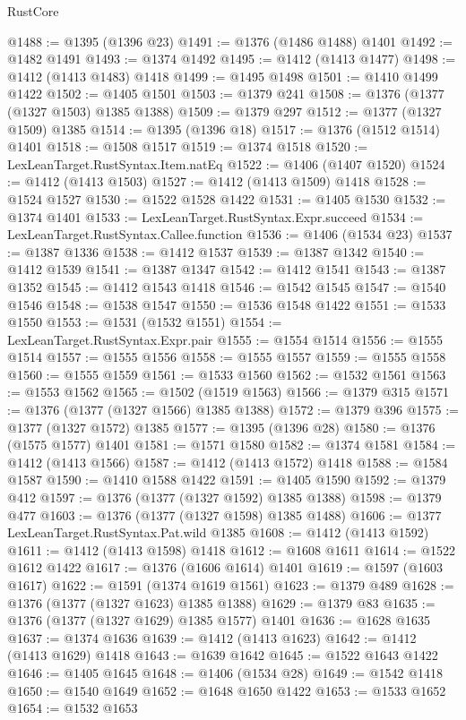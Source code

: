 \begin{lexlean}{RustCore}
\begin{coremodule}
@1488 := @1395 (@1396 @23)
@1491 := @1376 (@1486 @1488) @1401
@1492 := @1482 @1491
@1493 := @1374 @1492
@1495 := @1412 (@1413 @1477)
@1498 := @1412 (@1413 @1483) @1418
@1499 := @1495 @1498
@1501 := @1410 @1499 @1422
@1502 := @1405 @1501
@1503 := @1379 @241
@1508 := @1376 (@1377 (@1327 @1503) @1385 @1388)
@1509 := @1379 @297
@1512 := @1377 (@1327 @1509) @1385
@1514 := @1395 (@1396 @18)
@1517 := @1376 (@1512 @1514) @1401
@1518 := @1508 @1517
@1519 := @1374 @1518
@1520 := LexLeanTarget.RustSyntax.Item.natEq
@1522 := @1406 (@1407 @1520)
@1524 := @1412 (@1413 @1503)
@1527 := @1412 (@1413 @1509) @1418
@1528 := @1524 @1527
@1530 := @1522 @1528 @1422
@1531 := @1405 @1530
@1532 := @1374 @1401
@1533 := LexLeanTarget.RustSyntax.Expr.succeed
@1534 := LexLeanTarget.RustSyntax.Callee.function
@1536 := @1406 (@1534 @23)
@1537 := @1387 @1336
@1538 := @1412 @1537
@1539 := @1387 @1342
@1540 := @1412 @1539
@1541 := @1387 @1347
@1542 := @1412 @1541
@1543 := @1387 @1352
@1545 := @1412 @1543 @1418
@1546 := @1542 @1545
@1547 := @1540 @1546
@1548 := @1538 @1547
@1550 := @1536 @1548 @1422
@1551 := @1533 @1550
@1553 := @1531 (@1532 @1551)
@1554 := LexLeanTarget.RustSyntax.Expr.pair
@1555 := @1554 @1514
@1556 := @1555 @1514
@1557 := @1555 @1556
@1558 := @1555 @1557
@1559 := @1555 @1558
@1560 := @1555 @1559
@1561 := @1533 @1560
@1562 := @1532 @1561
@1563 := @1553 @1562
@1565 := @1502 (@1519 @1563)
@1566 := @1379 @315
@1571 := @1376 (@1377 (@1327 @1566) @1385 @1388)
@1572 := @1379 @396
@1575 := @1377 (@1327 @1572) @1385
@1577 := @1395 (@1396 @28)
@1580 := @1376 (@1575 @1577) @1401
@1581 := @1571 @1580
@1582 := @1374 @1581
@1584 := @1412 (@1413 @1566)
@1587 := @1412 (@1413 @1572) @1418
@1588 := @1584 @1587
@1590 := @1410 @1588 @1422
@1591 := @1405 @1590
@1592 := @1379 @412
@1597 := @1376 (@1377 (@1327 @1592) @1385 @1388)
@1598 := @1379 @477
@1603 := @1376 (@1377 (@1327 @1598) @1385 @1488)
@1606 := @1377 LexLeanTarget.RustSyntax.Pat.wild @1385
@1608 := @1412 (@1413 @1592)
@1611 := @1412 (@1413 @1598) @1418
@1612 := @1608 @1611
@1614 := @1522 @1612 @1422
@1617 := @1376 (@1606 @1614) @1401
@1619 := @1597 (@1603 @1617)
@1622 := @1591 (@1374 @1619 @1561)
@1623 := @1379 @489
@1628 := @1376 (@1377 (@1327 @1623) @1385 @1388)
@1629 := @1379 @83
@1635 := @1376 (@1377 (@1327 @1629) @1385 @1577) @1401
@1636 := @1628 @1635
@1637 := @1374 @1636
@1639 := @1412 (@1413 @1623)
@1642 := @1412 (@1413 @1629) @1418
@1643 := @1639 @1642
@1645 := @1522 @1643 @1422
@1646 := @1405 @1645
@1648 := @1406 (@1534 @28)
@1649 := @1542 @1418
@1650 := @1540 @1649
@1652 := @1648 @1650 @1422
@1653 := @1533 @1652
@1654 := @1532 @1653

\end{coremodule}
\end{lexlean}
